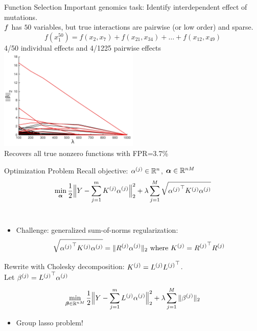 \begin{frame}{Function Selection}
Important genomics task: Identify interdependent effect of mutations. \\
\vspace{0.1in}
$f$ has $50$ variables, but true interactions are pairwise (or
low order) and sparse.
\[
f(x_1^{50}) = f(x_2,x_7) + f(x_{21},x_{34}) + \dots + f(x_{12},x_{49})
\]
4/50 individual effects and 4/1225 pairwise effects \\
\centering
\includegraphics[width=0.5\textwidth]{figs/solnpath600.pdf} \\
Recovers all true nonzero functions with FPR=3.7\%
\end{frame}

\begin{frame}{Optimization Problem}
Recall objective:  ${\alpha^{(j)}} \in \mathbb{R}^n$, ${\bm{\alpha}} \in \mathbb{R}^{nM}$
\begin{equation*}
\min_{\bm{\alpha}} \frac{1}{2}\Big\|Y - \sum_{j=1}^m {K^{(j)}} {\alpha^{(j)}}\Big\|_2^2 + 
  \lambda \sum_{j=1}^M \sqrt{{{\alpha^{(j)}}}^\top {K^{(j)}} {\alpha^{(j)}}}
\end{equation*} \\
\begin{itemize}
\item  Challenge: generalized sum-of-norms regularization:
\begin{equation*}
\sqrt{{{\alpha^{(j)}}}^\top {K^{(j)}} {\alpha^{(j)}}} = \|{R^{(j)}} {\alpha^{(j)}} \|_2 
\text{ where } {K^{(j)}} = {R^{(j)}}^\top {R^{(j)}}
\end{equation*}
\end{itemize}
Rewrite with Cholesky decomposition: ${K^{(j)}} = {L^{(j)}} {L^{(j)}}^\top$. \\ 
Let ${\beta^{(j)}} = {L^{(j)}}^\top {\alpha^{(j)}}$
\begin{equation*}
\min_{{\bm{\beta}} \in \mathbb{R}^{nM}} 
\frac{1}{2}\Big\|Y - \sum_{j=1}^m {L^{(j)}} {\alpha^{(j)}}\Big\|_2^2 + 
\lambda \sum_{j=1}^M \|{\beta^{(j)}}\|_2
\end{equation*}
\vspace{-0.2in}
\begin{itemize}
\item Group lasso problem!
\end{itemize}
\end{frame}

